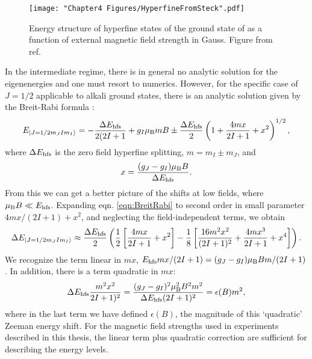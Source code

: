 \begin{figure}
	\texttt{[image: "Chapter4 Figures/HyperfineFromSteck".pdf]}
\caption[Energy structure of hyperfine states of \Rb{}]{Energy structure of hyperfine states of the ground state of \Rb{} as a function of external magnetic field strength in Gauss.  Figure from ref. \cite{Steck}}
\label{fig:hyperfineSteck}
\end{figure}

In the intermediate regime, there is in general no analytic solution for the eigenenergies and one must resort to numerics. However, for the specific case of $J=1/2$ applicable to alkali ground states, there is an analytic solution given by the Breit-Rabi formula \cite{BreitRabi}:
\begin{equation}
E_{\mathinner{|{J=1/2 m_J I m_I}\rangle}} = - \frac{\Delta E_{\rm hfs}}{2(2I+1}+g_I \mu_{\rm B} m B \pm \frac{\Delta E_{\rm hfs}}{2}\left(1+\frac{4mx}{2I+1}+x^2\right)^{1/2},
\label{eqn:BreitRabi}
\end{equation}
where $\Delta E_{\rm hfs}$ is the zero field hyperfine splitting, $m=m_I\pm m_J$, and
\begin{equation}
x=\frac{(g_J - g_I)\mu_{\rm B} B}{\Delta E_{\rm hfs}}.
\end{equation}
From this we can get a better picture of the shifts at low fields, where $\mu_{\rm B} B\ll E_{\rm hfs}$. Expanding eqn. \ref{eqn:BreitRabi} to second order in small parameter $4mx/(2I+1)+x^2$, and neglecting the field-independent terms, we obtain
\begin{equation}
\Delta E_{\mathinner{|{J=1/2 m_J I m_I}\rangle}}\approx \frac{\Delta E_{\rm hfs}}{2}\left(\frac{1}{2}\left[\frac{4mx}{2I+1}+x^2\right]-\frac{1}{8}\left[\frac{16m^2 x^2}{(2I+1)^2} +\frac{4mx^3}{2I+1}+x^4\right]\right).
\end{equation}
We recognize the term linear in $mx$,  $E_{\rm hfs}mx/(2I+1) = (g_J-g_I)\mu_{\rm B} B m/(2I+1)$. In addition, there is a term quadratic in $mx$:
\begin{equation}
\Delta E_{\rm hfs} \frac{m^2x^2}{2I+1)^2} = \frac{(g_J-g_I)^2 \mu_{\rm B}^2 B^2 m^2}{\Delta E_{\rm hfs} (2I+1)^2} = \epsilon(B) m^2,
\end{equation}
where in the last term we have defined $\epsilon(B)$, the magnitude of this \lq{quadratic}\rq{} Zeeman energy shift. For the magnetic field strengths used in experiments described in this thesis, the linear term plus quadratic correction are sufficient for describing the energy levels.
%
%	

